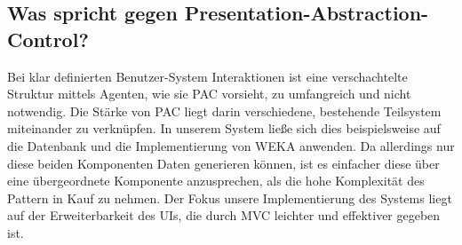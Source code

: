 \subsection{Was spricht gegen Presentation-Abstraction-Control?}
Bei klar definierten Benutzer-System Interaktionen ist eine verschachtelte Struktur mittels Agenten, wie sie PAC vorsieht, zu umfangreich und nicht notwendig. 
Die Stärke von PAC liegt darin verschiedene, bestehende Teilsystem miteinander zu verknüpfen. In unserem System ließe sich dies beispielsweise auf die Datenbank und die Implementierung von WEKA anwenden. Da allerdings nur diese beiden Komponenten Daten generieren können, ist es einfacher diese über eine übergeordnete Komponente anzusprechen, als die hohe Komplexität des Pattern in Kauf zu nehmen. 
Der Fokus unsere Implementierung des Systems liegt auf der Erweiterbarkeit des UIs, die durch MVC leichter und effektiver gegeben ist.